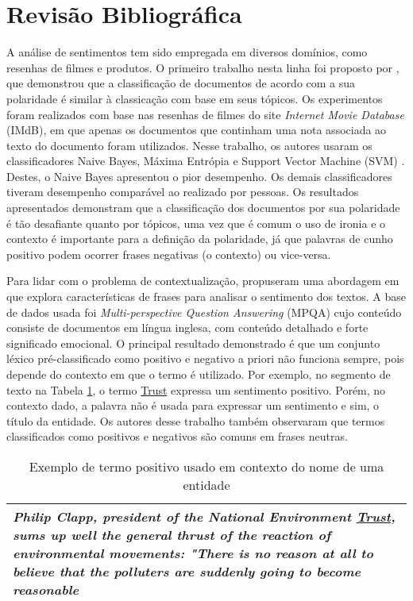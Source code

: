 \documentclass[a4paper,12pt]{article}
\begin{document}
\section{Revisão Bibliográfica}

A análise de sentimentos tem sido empregada em diversos domínios, como resenhas de filmes e produtos. O primeiro trabalho nesta linha foi proposto por \cite{thumbsup}, que demonstrou que a classificação de documentos de acordo com a sua polaridade é similar à classicação com base em seus tópicos. Os experimentos foram realizados com base nas resenhas de filmes do site \textit{Internet Movie Database} (IMdB), em que apenas os documentos que continham uma nota associada ao texto do documento foram utilizados. Nesse trabalho, os autores usaram os classificadores Naive Bayes, Máxima Entrópia e Support Vector Machine (SVM) \cite{Witten}. Destes, o Naive Bayes apresentou o pior desempenho. Os demais classificadores tiveram desempenho comparável ao realizado por pessoas. Os resultados apresentados demonstram que a classificação dos documentos por sua polaridade é tão desafiante quanto por tópicos, uma vez que é comum o uso de ironia e o contexto é importante para a definição da polaridade, já que palavras de cunho positivo podem ocorrer frases negativas (o contexto) ou vice-versa. 

Para lidar com o problema de contextualização, \cite{contextualpolarity} propuseram uma abordagem em que explora características de frases para analisar o sentimento dos textos. A base de dados usada foi \textit{Multi-perspective Question Answering} (MPQA) cujo conteúdo consiste de documentos em língua inglesa, com conteúdo detalhado e forte significado emocional. O principal resultado demonstrado é que um conjunto léxico pré-classificado como positivo e negativo a priori não funciona sempre, pois depende do contexto em que o termo é utilizado. Por exemplo, no segmento de texto na Tabela \ref{tab:exemplo2}, o termo \underline{Trust} expressa um sentimento positivo. Porém, no contexto dado, a palavra não é usada para expressar um sentimento e sim, o título da entidade. Os autores desse trabalho também observaram que termos classificados como positivos e negativos são comuns em frases neutras. 

\begin{table}[h!]
\begin{tabular}{|l|}
\hline
\begin{minipage}[t]{1.0\columnwidth}
\emph{Philip Clapp, president of the National Environment \underline{Trust}, sums up well the general thrust of the reaction of environmental movements: "There is no reason at all to believe that the polluters are suddenly going to become reasonable}
\end{minipage}\tabularnewline
\hline
\end{tabular}
\caption{Exemplo de termo positivo usado em contexto do nome de uma entidade}
\label{tab:exemplo2}
\end{table}
\end{document}
